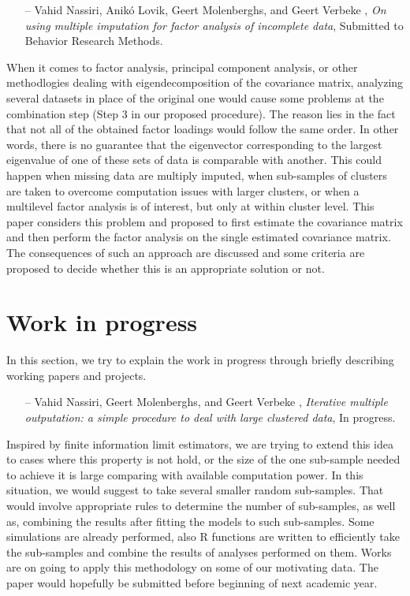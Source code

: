 \documentclass[14pt]{article}
\begin{document}
\begin{itemize}
\item[--]{\textsf{Vahid Nassiri, Anik\'{o} Lovik, Geert Molenberghs, and Geert Verbeke}} , {\it On using multiple imputation for factor analysis of incomplete data}, Submitted to Behavior Research Methods.
\end{itemize}
When it comes to factor analysis, principal component analysis, or other methodlogies dealing with  eigendecomposition of the covariance matrix, analyzing several datasets in place of the original one would cause some problems at the combination step (Step 3 in our proposed procedure). The reason lies in the fact that not all of the obtained factor loadings would follow the same order. In other words, there is no guarantee that the eigenvector corresponding to the largest eigenvalue of one of these sets of data is comparable with another. This could happen when missing data are multiply imputed, when sub-samples of clusters are taken to overcome computation issues with larger clusters, or when a multilevel factor analysis is of interest, but only at within cluster level. This paper considers this problem and proposed to first estimate the covariance matrix and then perform the factor analysis on the single estimated covariance matrix. The consequences of such an approach are discussed and some criteria are proposed to decide whether this is an appropriate solution or not.



\section{Work in progress}
\label{sec_progress}

In this section, we try to explain the work in progress through briefly describing working papers and projects.

\begin{itemize}
\item[--]{\textsf{Vahid Nassiri, Geert Molenberghs, and Geert Verbeke}} , {\it Iterative multiple outputation: a simple procedure to deal with large clustered data}, In progress.
\end{itemize}
Inspired by finite information limit estimators, we are trying to extend this idea to cases where this property is not hold, or the size of the one sub-sample needed to achieve it is large comparing with available computation power. In this situation, we would suggest to take several smaller random sub-samples. That would involve appropriate rules to determine the number of sub-samples, as well as, combining the results after fitting the models to such sub-samples. Some simulations are already performed, also \textsf{R} functions are written to efficiently take the sub-samples and combine the results of analyses performed on them. Works are on going to apply this methodology on some of our motivating data. The paper would hopefully be submitted before beginning of next academic year.
\end{document}
